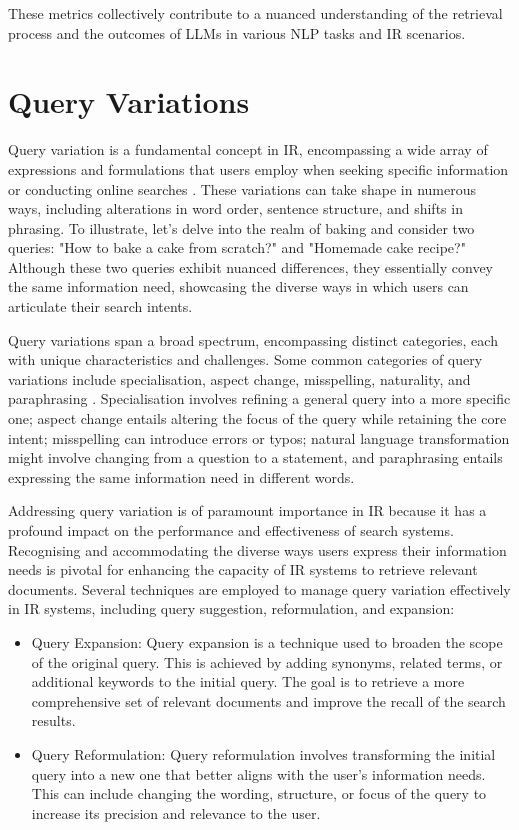 These metrics collectively contribute to a nuanced understanding of the retrieval process and the outcomes of LLMs in various NLP tasks and IR scenarios.

\section{Query Variations}
Query variation is a fundamental concept in IR, encompassing a wide array of expressions and formulations that users employ when seeking specific information or conducting online searches \cite{zendel}. These variations can take shape in numerous ways, including alterations in word order, sentence structure, and shifts in phrasing. To illustrate, let's delve into the realm of baking and consider two queries: "How to bake a cake from scratch?" and "Homemade cake recipe?" Although these two queries exhibit nuanced differences, they essentially convey the same information need, showcasing the diverse ways in which users can articulate their search intents.

Query variations span a broad spectrum, encompassing distinct categories, each with unique characteristics and challenges. Some common categories of query variations include specialisation, aspect change, misspelling, naturality, and paraphrasing \cite{penha2022}. Specialisation involves refining a general query into a more specific one; aspect change entails altering the focus of the query while retaining the core intent; misspelling can introduce errors or typos; natural language transformation might involve changing from a question to a statement, and paraphrasing entails expressing the same information need in different words.

Addressing query variation is of paramount importance in IR because it has a profound impact on the performance and effectiveness of search systems. Recognising and accommodating the diverse ways users express their information needs is pivotal for enhancing the capacity of IR systems to retrieve relevant documents. Several techniques are employed to manage query variation effectively in IR systems, including query suggestion, reformulation, and expansion:
\begin{itemize}
    \item Query Expansion: Query expansion is a technique used to broaden the scope of the original query. This is achieved by adding synonyms, related terms, or additional keywords to the initial query. The goal is to retrieve a more comprehensive set of relevant documents and improve the recall of the search results.
    \item Query Reformulation: Query reformulation involves transforming the initial query into a new one that better aligns with the user's information needs. This can include changing the wording, structure, or focus of the query to increase its precision and relevance to the user.
\end{itemize}

